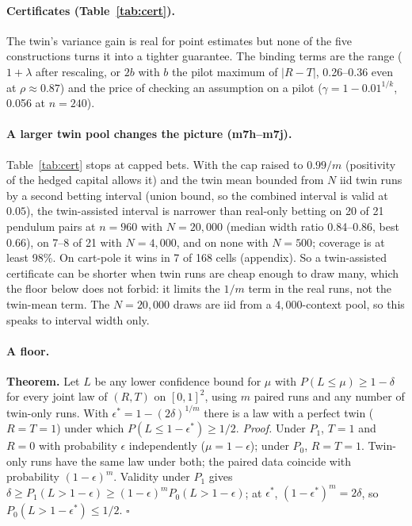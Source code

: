 \documentclass[11pt]{article}
\begin{document}
\paragraph{Certificates (Table~\ref{tab:cert}).} The twin's variance gain is real for point estimates but none of the five constructions turns it into a tighter guarantee. The binding terms are the range ($1+\lambda$ after rescaling, or $2b$ with $b$ the pilot maximum of $|R-T|$, 0.26--0.36 even at $\rho\approx0.87$) and the price of checking an assumption on a pilot ($\gamma=1-0.01^{1/k}$, 0.056 at $n=240$).

\paragraph{A larger twin pool changes the picture (m7h--m7j).} Table~\ref{tab:cert} stops at capped bets. With the cap raised to $0.99/m$ (positivity of the hedged capital allows it) and the twin mean bounded from $N$ iid twin runs by a second betting interval (union bound, so the combined interval is valid at $0.05$), the twin-assisted interval is narrower than real-only betting on 20 of 21 pendulum pairs at $n=960$ with $N=20{,}000$ (median width ratio 0.84--0.86, best 0.66), on 7--8 of 21 with $N=4{,}000$, and on none with $N=500$; coverage is at least 98\%. On cart-pole it wins in 7 of 168 cells (appendix). So a twin-assisted certificate can be shorter when twin runs are cheap enough to draw many, which the floor below does not forbid: it limits the $1/m$ term in the real runs, not the twin-mean term. The $N=20{,}000$ draws are iid from a $4{,}000$-context pool, so this speaks to interval width only.

\paragraph{A floor.} \textbf{Theorem.} Let $L$ be any lower confidence bound for $\mu$ with $P(L\le\mu)\ge1-\delta$ for every joint law of $(R,T)$ on $[0,1]^2$, using $m$ paired runs and any number of twin-only runs. With $\epsilon^*=1-(2\delta)^{1/m}$ there is a law with a perfect twin ($R=T=1$) under which $P(L\le 1-\epsilon^*)\ge 1/2$. \emph{Proof.} Under $P_1$, $T=1$ and $R=0$ with probability $\epsilon$ independently ($\mu=1-\epsilon$); under $P_0$, $R=T=1$. Twin-only runs have the same law under both; the paired data coincide with probability $(1-\epsilon)^m$. Validity under $P_1$ gives $\delta\ge P_1(L>1-\epsilon)\ge(1-\epsilon)^mP_0(L>1-\epsilon)$; at $\epsilon^*$, $(1-\epsilon^*)^m=2\delta$, so $P_0(L>1-\epsilon^*)\le1/2$. \hfill$\square$
\end{document}
